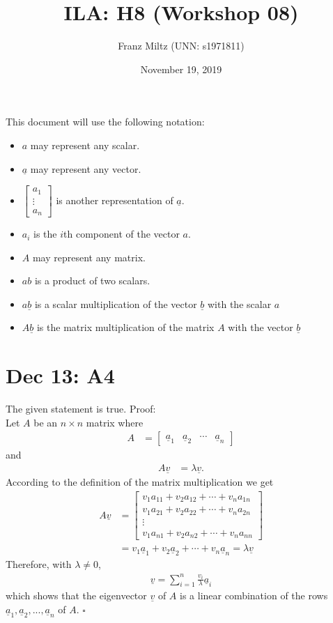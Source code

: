 \documentclass{article}
\title{ILA: H8 (Workshop 08)}
\author{Franz Miltz (UNN: s1971811)}
\date{November 19, 2019}
\renewcommand{\vec}{\underline}
\begin{document}
\maketitle
This document will use the following notation:
\begin{itemize}
    \item $a$ may represent any scalar.
    \item $\vec{a}$ may represent any vector.
    \item $\begin{bmatrix}
        a_1\\
        \vdots\\
        a_n
    \end{bmatrix}$ is another representation of $\vec a$. 
    \item $a_i$ is the $i$th component of the vector $a$.
    \item $A$ may represent any matrix.
    \item $ab$ is a product of two scalars.
    \item $a\vec{b}$ is a scalar multiplication of the vector $\vec{b}$ with the scalar $a$
    \item $A\vec b$ is the matrix multiplication of the matrix $A$ with the vector $\vec b$
\end{itemize}
\section*{Dec 13: A4}
The given statement is true. Proof:\\
Let $A$ be an $n\times n$ matrix where
\begin{align*}
    A&=\begin{bmatrix}
        \vec a_1&\vec a_2&\cdots&\vec a_n
    \end{bmatrix}
\end{align*}
and
\begin{align*}
    A\vec v &= \lambda\vec v.
\end{align*}
According to the definition of the matrix multiplication we get
\begin{align*}
    A\vec v &= \begin{bmatrix}
        v_1a_{11} + v_2a_{12} + \cdots + v_na_{1n}\\
        v_1a_{21} + v_2a_{22} + \cdots + v_na_{2n}\\
        \vdots\\
        v_1a_{n1} + v_2a_{n2} + \cdots + v_na_{nn}
    \end{bmatrix}\\
    &= v_1\vec a_1 + v_2\vec a_2 + \cdots + v_n\vec a_n = \lambda \vec v
\end{align*}
Therefore, with $\lambda\not=0$,
\begin{align*}
    \vec v = \sum_{i=1}^n \frac{v_i}{\lambda} \vec a_i
\end{align*}
which shows that the eigenvector $\vec v$ of $A$ is a linear combination of the rows $\vec a_1, \vec a_2, ..., \vec a_n$ of $A$. $\square$
\end{document}
